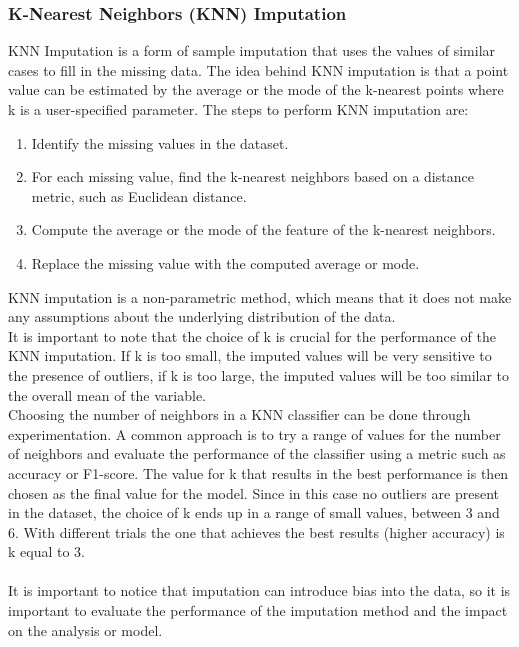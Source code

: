 \documentclass{article}
\begin{document}
\subsubsection*{K-Nearest Neighbors (KNN) Imputation}
KNN Imputation is a form of sample imputation that uses the values of similar cases to fill in the missing data. The idea behind KNN imputation is that a point value can be estimated by the average or the mode of the k-nearest points where k is a user-specified parameter. The steps to perform KNN imputation are:
\begin{enumerate}
    \item Identify the missing values in the dataset.
    \item For each missing value, find the k-nearest neighbors based on a distance metric, such as Euclidean distance.
    \item Compute the average or the mode of the feature of the k-nearest neighbors.
    \item Replace the missing value with the computed average or mode.
\end{enumerate}
KNN imputation is a non-parametric method, which means that it does not make any assumptions about the underlying distribution of the data.\\
It is important to note that the choice of k is crucial for the performance of the KNN imputation. If k is too small, the imputed values will be very sensitive to the presence of outliers, if k is too large, the imputed values will be too similar to the overall mean of the variable.\\
Choosing the number of neighbors in a KNN classifier can be done through experimentation. A common approach is to try a range of values for the number of neighbors and evaluate the performance of the classifier using a metric such as accuracy or F1-score. The value for k that results in the best performance is then chosen as the final value for the model.
Since in this case no outliers are present in the dataset, the choice of k ends up in a range of small values, between 3 and 6. With different trials the one that achieves the best results (higher accuracy) is k equal to 3.\\\\
It is important to notice that imputation can introduce bias into the data, so it is important to evaluate the performance of the imputation method and the impact on the analysis or model.

\newpage
\end{document}

